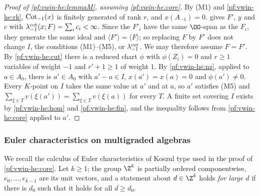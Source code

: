 \begin{proof}[Proof of \cref{pf:vwin-he:lemmaM}, assuming \cref{pf:vwin-he:core}]
By (M1) and \cref{pf:vwin-he:rk}, $\operatorname{Cot}_{-1}(x)$ is finitely generated of rank
$r$, and $x(A_{-1})=0$.  gives $F'$, $y$ and $c$ with
$\lambda^{\mathrm{cot}}_{-1}(x;F)=\sum_ic_i<\infty$. Since the $F'_i$ have the same $\OO$-span as the $F_i$, they generate the
same ideal and $\langle F'\rangle=\langle F\rangle$; so replacing $F$ by $F'$ does not change $I$, the conditions
(M1)--(M5), or $\lambda^{\mathrm{cot}}_{-1}$. We may therefore assume $F=F'$. By \cref{pf:vwin-he:cut} there is a reduced
chart $\phi$ with $\phi(Z_i)=0$ and $r\ge1$ variables of weight $-1$ and $r'+1\ge1$ of weight $1$. By
\cref{pf:vwin-he:nz}, applied to $a\in A_0$, there is $a'\in A_0$ with $a'-a\in I$, $x(a')=x(a)=0$ and
$\phi(a')\ne0$. Every $K$-point on $I$ takes the same value at $a'$ and at $a$, so $a'$ satisfies (M5) and
$\sum_{\xi\in T}v(\xi(a'))=\sum_{\xi\in T}v(\xi(a))$ for every $T$. A finite set covering $I$ exists by
\cref{pf:vwin-he:hom} and \cref{pf:vwin-he:fin}, and the inequality follows from \cref{pf:vwin-he:core} applied to
$a'$.
\end{proof}

\subsubsection{Euler characteristics on multigraded algebras}

We recall the calculus of Euler characteristics of Koszul type used in the proof of \cref{pf:vwin-he:core}. Let
$k\ge1$; the group $\Z^k$ is partially ordered componentwise, $e_0,\dots,e_{k-1}$ are its unit vectors, and a
statement about $d\in\Z^k$ holds \emph{for large $d$} if there is $d_0$ such that it holds for all $d\ge d_0$.

